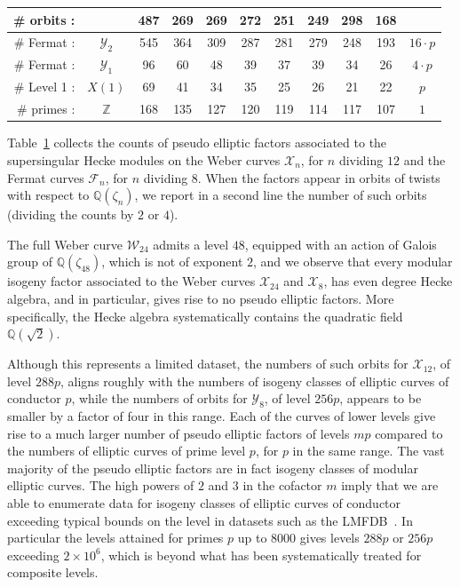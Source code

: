 \documentclass{amsart}
\newcommand{\cF}{\mathcal{F}}
\newcommand{\cX}{\mathcal{X}}
\newcommand{\cY}{\mathcal{Y}}
\newcommand{\cW}{\mathcal{W}}
\newcommand{\QQ}{\mathbb{Q}}
\newcommand{\ZZ}{\mathbb{Z}}
\begin{document}
\begin{table}[h!]
\begin{tabular}{@{}r|*{10}{c|}}
  \# orbits :   &    &  487 &  269 &  269 &  272 &  251 &  249 &  298 &  168 & \\ \hline
  \# Fermat :   & $\cY_2$
                     &  545 &  364 &  309 &  287 &  281 &  279 &  248 &  193 & $16 \cdot p$ \\ \hline
  \# Fermat :   & $\cY_1$
                     &  96  &   60 &   48 &   39 &   37 &  39  &   34 &   26 & $4 \cdot p$ \\ \hline
  \# Level 1 :  & $X(1)$
                     &   69 &   41 &  34  &   35 &   25 &   26 &   21 &   22 & $p$ \\ \hline
  \# primes :   & $\ZZ$
                     & 168  &  135 &  127 &  120 &  119 &  114 &  117 &  107 & $1$ \\  \hline
\end{tabular}
\label{table:pseudo-elliptic}
\end{table}

Table~\ref{table:pseudo-elliptic} collects the counts of pseudo elliptic factors
associated to the supersingular Hecke modules on the Weber curves $\cX_n$, for
$n$ dividing $12$ and the Fermat curves $\cF_n$, for $n$ dividing $8$.
When the factors appear in orbits of twists with respect to $\QQ(\zeta_n)$,
we report in a second line the number of such orbits (dividing the counts
by $2$ or $4$).

The full Weber curve $\cW_{24}$ admits a level $48$, equipped with an action
of Galois group of $\QQ(\zeta_{48})$, which is not of exponent $2$, and we
observe that every modular isogeny factor associated to the Weber curves
$\cX_{24}$ and $\cX_{8}$, has even degree Hecke algebra, and in particular,
gives rise to no pseudo elliptic factors.  More specifically, the Hecke
algebra systematically contains the quadratic field $\QQ(\sqrt{2})$.

Although this represents a limited dataset, the numbers of such orbits for
$\cX_{12}$, of level $288p$, aligns roughly with the numbers of isogeny
classes of elliptic curves of conductor $p$, while the numbers of orbits
for $\cY_{8}$, of level $256p$, appears to be smaller by a factor of four
in this range.
Each of the curves of lower levels give rise to a much larger number of
pseudo elliptic factors of levels $mp$ compared to the numbers of elliptic
curves of prime level $p$, for $p$ in the same range.  The vast majority
of the pseudo elliptic factors are in fact isogeny classes of modular
elliptic curves.  The high powers of $2$ and $3$ in the cofactor $m$
imply that we are able to enumerate data for isogeny classes of elliptic
curves of conductor exceeding typical bounds on the level in datasets
such as the LMFDB~\cite{LMFDB}.  In particular the levels attained
for primes $p$ up to $8000$ gives levels $288p$ or $256p$ exceeding
$2 \times 10^6$, which is beyond what has been systematically treated
for composite levels.
\end{document}
